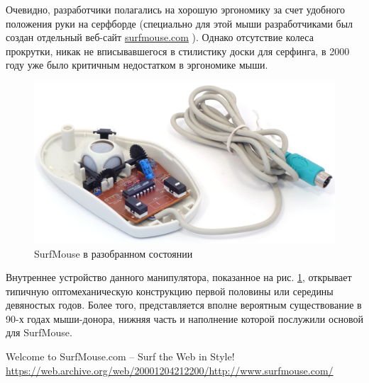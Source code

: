 \documentclass[11pt, a4paper]{article}
\begin{document}
Очевидно, разработчики полагались на хорошую эргономику за счет удобного положения руки на серфборде (специально для этой мыши разработчиками был создан отдельный веб-сайт \url{surfmouse.com} \cite{site}). Однако отсутствие колеса прокрутки, никак не вписывавшегося в стилистику доски для серфинга, в 2000 году уже было критичным недостатком в эргономике мыши.

\begin{figure}[h]
    \centering
    \includegraphics[scale=0.6]{2000_surf_mouse/inside_60.jpg}
    \caption{SurfMouse в разобранном состоянии}
    \label{fig:SurfMouseInside}
\end{figure}

Внутреннее устройство данного манипулятора, показанное на рис. \ref{fig:SurfMouseInside}, открывает типичную оптомеханическую конструкцию первой половины или середины девяностых годов. Более того, представляется вполне вероятным существование в 90-х годах мыши-донора, нижняя часть и наполнение которой послужили основой для SurfMouse.

\begin{thebibliography}{9}
     Welcome to SurfMouse.com -- Surf the Web in Style! \url{https://web.archive.org/web/20001204212200/http://www.surfmouse.com/}
\end{thebibliography}
\end{document}
